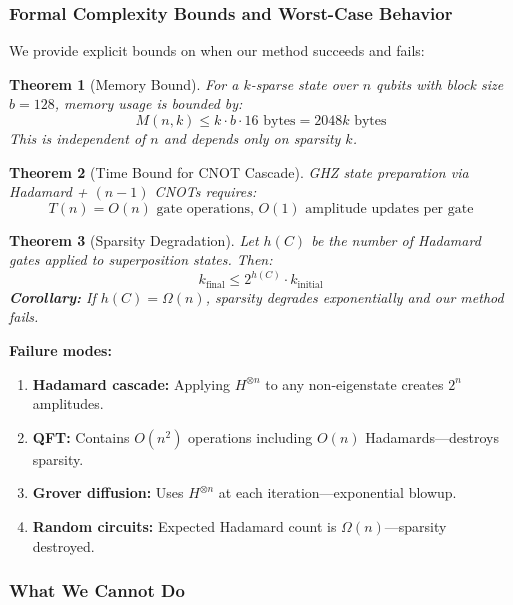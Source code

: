 \documentclass[11pt,twocolumn]{article}
\newtheorem{theorem}{Theorem}
\begin{document}
\subsubsection{Formal Complexity Bounds and Worst-Case Behavior}

We provide explicit bounds on when our method succeeds and fails:

\begin{theorem}[Memory Bound]
For a $k$-sparse state over $n$ qubits with block size $b = 128$, memory usage is bounded by:
\begin{equation}
    M(n, k) \leq k \cdot b \cdot 16 \text{ bytes} = 2048k \text{ bytes}
\end{equation}
This is independent of $n$ and depends only on sparsity $k$.
\end{theorem}

\begin{theorem}[Time Bound for CNOT Cascade]
GHZ state preparation via Hadamard + $(n-1)$ CNOTs requires:
\begin{equation}
    T(n) = O(n) \text{ gate operations, } O(1) \text{ amplitude updates per gate}
\end{equation}
\end{theorem}

\begin{theorem}[Sparsity Degradation]
Let $h(C)$ be the number of Hadamard gates applied to superposition states. Then:
\begin{equation}
    k_{\text{final}} \leq 2^{h(C)} \cdot k_{\text{initial}}
\end{equation}
\textbf{Corollary:} If $h(C) = \Omega(n)$, sparsity degrades exponentially and our method fails.
\end{theorem}

\textbf{Failure modes:}
\begin{enumerate}
    \item \textbf{Hadamard cascade:} Applying $H^{\otimes n}$ to any non-eigenstate creates $2^n$ amplitudes.
    \item \textbf{QFT:} Contains $O(n^2)$ operations including $O(n)$ Hadamards---destroys sparsity.
    \item \textbf{Grover diffusion:} Uses $H^{\otimes n}$ at each iteration---exponential blowup.
    \item \textbf{Random circuits:} Expected Hadamard count is $\Omega(n)$---sparsity destroyed.
\end{enumerate}

\subsubsection{What We Cannot Do}
\end{document}
